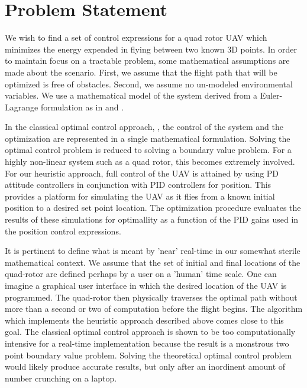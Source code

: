
\chapter{Problem Statement} %

\label{Chapter2} %




We wish to find a set of control expressions for a quad rotor UAV which minimizes the energy expended in flying between two known 3D points. In order to maintain focus on a tractable problem, some mathematical assumptions are made about the scenario. First, we assume that the flight path that will be optimized is free of obstacles. Second, we assume no un-modeled environmental variables. We use a mathematical model of the system derived from a Euler-Lagrange formulation as in \cite{Luukkonen} and \cite{bouabdallah2004pid}. 

In the classical optimal control approach,\cite{BrysonHo69} \cite{kirk70} \cite{lewis2012optimal}, the control of the system and the optimization are represented in a single mathematical formulation. Solving the optimal control problem is reduced to solving a boundary value problem. For a highly non-linear system such as a quad rotor, this becomes extremely involved. For our heuristic approach, full control of the UAV is attained by using PD attitude controllers in conjunction with PID controllers for position. This provides a platform for simulating the UAV as it flies from a known initial position to a desired set point location. The optimization procedure evaluates the results of these simulations for optimallity as a function of the PID gains used in the position control expressions.\cite{rao2009engineering} \cite{richard1988douglas}   

It is pertinent to define what is meant by 'near' real-time in our somewhat sterile mathematical context. We assume that the set of initial and final locations of the quad-rotor are defined perhaps by a user on a 'human' time scale. One can imagine a graphical user interface in which the desired location of the UAV is programmed. The quad-rotor then physically traverses the optimal path without more than a second or two of computation before the flight begins. The algorithm which implements the heuristic approach described above comes close to this goal. The classical optimal control approach is shown to be too computationally intensive for a real-time implementation because the result is a monstrous two point boundary value problem. Solving the theoretical optimal control problem would likely produce accurate results, but only after an inordinent amount of number crunching on a laptop.

